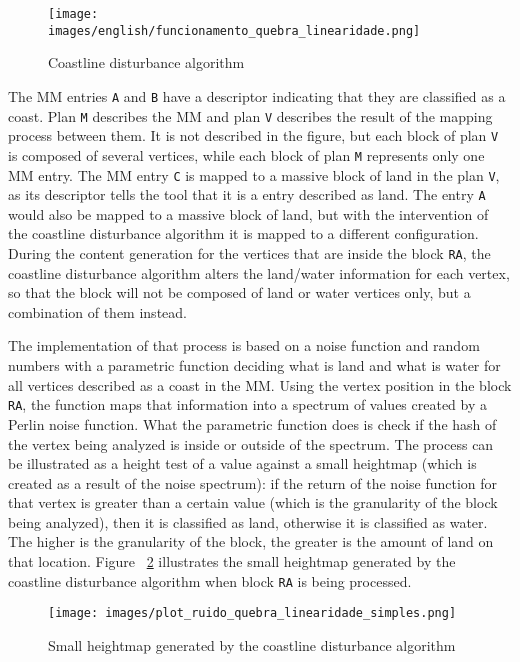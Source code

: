 \documentclass[10pt, conference, compsocconf]{IEEEtran}
\begin{document}
\begin{figure}
\centering
\texttt{[image: images/english/funcionamento\_quebra\_linearidade.png]}
\caption{Coastline disturbance algorithm}
\label{fig:funcionamento_quebra_linearidade}
\end{figure}

The MM entries {\tt A} and {\tt B} have a descriptor indicating that they are classified as a coast. Plan {\tt M} describes the MM and plan {\tt V} describes the result of the mapping process between them. It is not described in the figure, but each block of plan {\tt V} is composed of several vertices, while each block of plan {\tt M} represents only one MM entry. The MM entry {\tt C} is mapped to a massive block of land in the plan {\tt V}, as its descriptor tells the tool that it is a entry described as land. The entry {\tt A} would also be mapped to a massive block of land, but with the intervention of the coastline disturbance algorithm it is mapped to a different configuration. During the content generation for the vertices that are inside the block {\tt RA}, the coastline disturbance algorithm alters the land/water information for each vertex, so that the block will not be composed of land or water vertices only, but a combination of them instead.

The implementation of that process is based on a noise function and random numbers with a parametric function deciding what is land and what is water for all vertices described as a coast in the MM. Using the vertex position in the block {\tt RA}, the function maps that information into a spectrum of values created by a Perlin noise function. What the parametric function does is check if the hash of the vertex being analyzed is inside or outside of the spectrum. The process can be illustrated as a height test of a value against a small heightmap (which is created as a result of the noise spectrum): if the return of the noise function for that vertex is greater than a certain value (which is the granularity of the block being analyzed), then it is classified as land, otherwise it is classified as water. The higher is the granularity of the block, the greater is the amount of land on that location. Figure ~\ref{fig:plot_ruido_quebra_linearidade} illustrates the small heightmap generated by the coastline disturbance algorithm when block {\tt RA} is being processed. 

\begin{figure}
\centering
\texttt{[image: images/plot\_ruido\_quebra\_linearidade\_simples.png]}
\caption{Small heightmap generated by the coastline disturbance algorithm}
\label{fig:plot_ruido_quebra_linearidade}
\end{figure}
\end{document}
